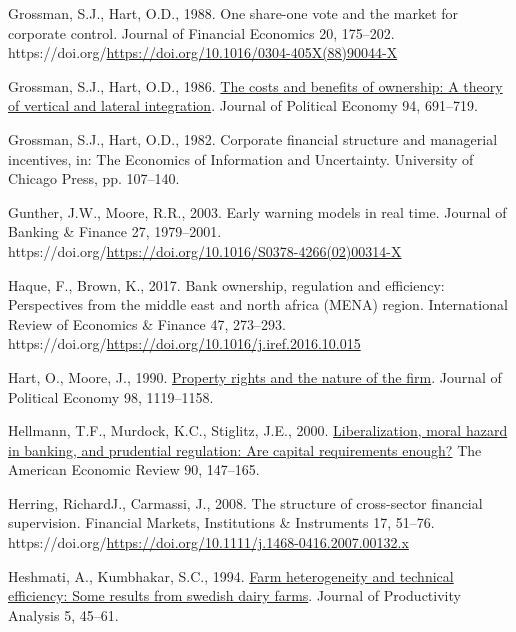 \documentclass[
  12pt,
  a4paper,
]{scrreprt}
\newlength{\cslhangindent}
\newenvironment{CSLReferences}[2] %
 {\begin{list}{}{%
  \setlength{\itemindent}{0pt}
  \setlength{\leftmargin}{0pt}
  \setlength{\parsep}{0pt}
  \ifodd #1
   \setlength{\leftmargin}{\cslhangindent}
   \setlength{\itemindent}{-1\cslhangindent}
  \fi
  \setlength{\itemsep}{#2\baselineskip}}}
 {\end{list}}
\begin{document}
\begin{CSLReferences}{1}{0}
Grossman, S.J., Hart, O.D., 1988. One share-one vote and the market for
corporate control. Journal of Financial Economics 20, 175--202.
https://doi.org/\url{https://doi.org/10.1016/0304-405X(88)90044-X}

Grossman, S.J., Hart, O.D., 1986.
\href{http://www.jstor.org/stable/1833199}{The costs and benefits of
ownership: A theory of vertical and lateral integration}. Journal of
Political Economy 94, 691--719.

Grossman, S.J., Hart, O.D., 1982. Corporate financial structure and
managerial incentives, in: The Economics of Information and Uncertainty.
University of Chicago Press, pp. 107--140.

Gunther, J.W., Moore, R.R., 2003. Early warning models in real time.
Journal of Banking \& Finance 27, 1979--2001.
https://doi.org/\url{https://doi.org/10.1016/S0378-4266(02)00314-X}

Haque, F., Brown, K., 2017. Bank ownership, regulation and efficiency:
Perspectives from the middle east and north africa (MENA) region.
International Review of Economics \& Finance 47, 273--293.
https://doi.org/\url{https://doi.org/10.1016/j.iref.2016.10.015}

Hart, O., Moore, J., 1990.
\href{http://www.jstor.org/stable/2937753}{Property rights and the
nature of the firm}. Journal of Political Economy 98, 1119--1158.

Hellmann, T.F., Murdock, K.C., Stiglitz, J.E., 2000.
\href{http://www.jstor.org.queens.ezp1.qub.ac.uk/stable/117285}{Liberalization,
moral hazard in banking, and prudential regulation: Are capital
requirements enough?} The American Economic Review 90, 147--165.

Herring, RichardJ., Carmassi, J., 2008. The structure of cross-sector
financial supervision. Financial Markets, Institutions \& Instruments
17, 51--76.
https://doi.org/\url{https://doi.org/10.1111/j.1468-0416.2007.00132.x}

Heshmati, A., Kumbhakar, S.C., 1994.
\href{http://www.jstor.org/stable/41769891}{Farm heterogeneity and
technical efficiency: Some results from swedish dairy farms}. Journal of
Productivity Analysis 5, 45--61.


\end{CSLReferences}
\end{document}
